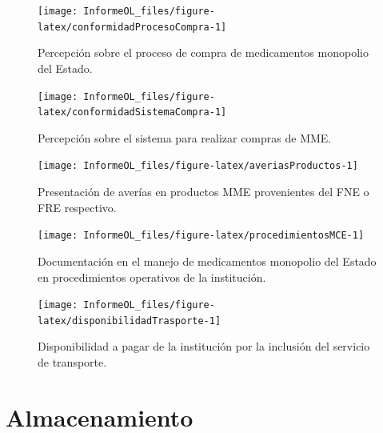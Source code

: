 \documentclass[
  oneside]{book}
\begin{document}
\begin{figure}

{\centering \texttt{[image: InformeOL\_files/figure-latex/conformidadProcesoCompra-1]} 

}

\caption{Percepción sobre el proceso de compra de medicamentos monopolio del Estado.}\label{fig:conformidadProcesoCompra}
\end{figure}
\begin{figure}

{\centering \texttt{[image: InformeOL\_files/figure-latex/conformidadSistemaCompra-1]} 

}

\caption{Percepción sobre el sistema para realizar compras de MME.}\label{fig:conformidadSistemaCompra}
\end{figure}
\begin{figure}

{\centering \texttt{[image: InformeOL\_files/figure-latex/averiasProductos-1]} 

}

\caption{Presentación de averías en productos MME provenientes del FNE o FRE respectivo.}\label{fig:averiasProductos}
\end{figure}

\begin{figure}

{\centering \texttt{[image: InformeOL\_files/figure-latex/procedimientosMCE-1]} 

}

\caption{Documentación en el manejo de medicamentos monopolio del Estado en procedimientos operativos de la institución.}\label{fig:procedimientosMCE}
\end{figure}

\begin{figure}

{\centering \texttt{[image: InformeOL\_files/figure-latex/disponibilidadTrasporte-1]} 

}

\caption{Disponibilidad a pagar de la institución por la inclusión del servicio de transporte.}\label{fig:disponibilidadTrasporte}
\end{figure}

\hypertarget{almacenamiento}{%
\chapter{Almacenamiento}\label{almacenamiento}}
\end{document}
